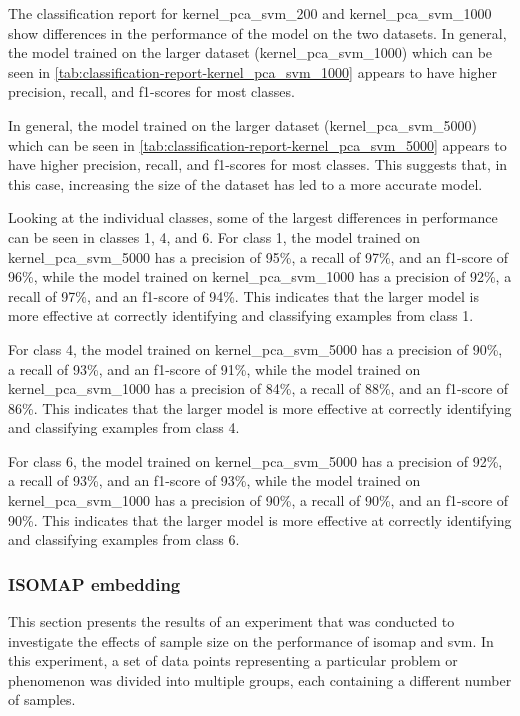 

The classification report for kernel\_pca\_svm\_200 and kernel\_pca\_svm\_1000 show differences in the performance of the model on the two datasets. In general, the model trained on the larger dataset (kernel\_pca\_svm\_1000) which can be seen in \autoref{tab:classification-report-kernel_pca_svm_1000} appears to have higher precision, recall, and f1-scores for most classes.



In general, the model trained on the larger dataset (kernel\_pca\_svm\_5000) which can be seen in \autoref{tab:classification-report-kernel_pca_svm_5000} appears to have higher precision, recall, and f1-scores for most classes. This suggests that, in this case, increasing the size of the dataset has led to a more accurate model.

Looking at the individual classes, some of the largest differences in performance can be seen in classes 1, 4, and 6. For class 1, the model trained on kernel\_pca\_svm\_5000 has a precision of 95\%, a recall of 97\%, and an f1-score of 96\%, while the model trained on kernel\_pca\_svm\_1000 has a precision of 92\%, a recall of 97\%, and an f1-score of 94\%. This indicates that the larger model is more effective at correctly identifying and classifying examples from class 1.

For class 4, the model trained on kernel\_pca\_svm\_5000 has a precision of 90\%, a recall of 93\%, and an f1-score of 91\%, while the model trained on kernel\_pca\_svm\_1000 has a precision of 84\%, a recall of 88\%, and an f1-score of 86\%. This indicates that the larger model is more effective at correctly identifying and classifying examples from class 4.

For class 6, the model trained on kernel\_pca\_svm\_5000 has a precision of 92\%, a recall of 93\%, and an f1-score of 93\%, while the model trained on kernel\_pca\_svm\_1000 has a precision of 90\%, a recall of 90\%, and an f1-score of 90\%. This indicates that the larger model is more effective at correctly identifying and classifying examples from class 6.

\subsubsection{ISOMAP embedding}\label{subsubsec:experiment_4_isomap}
This section presents the results of an experiment that was conducted to investigate the effects of sample size on the performance of \gls{isomap} and \gls{svm}. In this experiment, a set of data points representing a particular problem or phenomenon was divided into multiple groups, each containing a different number of samples.

